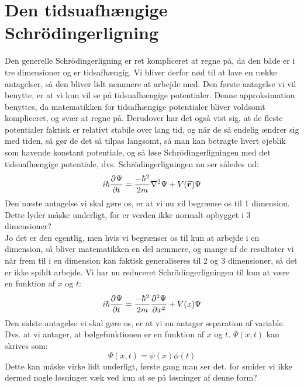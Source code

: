 \documentclass[../Kvantemekanik.tex]{subfiles}
\begin{document}
\section{Den tidsuafhængige Schrödingerligning}
Den generelle Schrödingerligning er ret kompliceret at regne på, da den både er i tre dimensioner og er tidsafhængig. Vi bliver derfor nød til at lave en række antagelser, så den bliver lidt nemmere at arbejde med.
Den første antagelse vi vil benytte, er at vi kun vil se på tidsuafhængige potentialer. Denne approksimation benyttes, da matematikken for tidsafhængige potentialer bliver voldsomt kompliceret, og svær at regne på. Derudover har det også vist sig, at de fleste potentialer faktisk er relativt stabile over lang tid, og når de så endelig ændrer sig med tiden, så gør de det så tilpas langsomt, så man kan betragte hvert øjeblik som havende konstant potentiale, og så løse Schrödingerligningen med det tidsuafhængige potentiale, dvs. Schrödingerligningen nu ser således ud:
\begin{equation}
    i\hbar\pdif{t} \Psi =\frac{-\hbar^{2}}{2m}\nabla^{2}\Psi+V(\v r)\Psi
\end{equation}
Den næste antagelse vi skal gøre os, er at vi nu vil begrænse os til 1 dimension. Dette lyder måske underligt, for er verden ikke normalt opbygget i 3 dimensioner?
\\
Jo det er den egentlig, men hvis vi begrænser os til kun at arbejde i en dimension, så bliver matematikken en del nemmere, og mange af de resultater vi når frem til i en dimension kan faktisk generaliseres til 2 og 3 dimensioner, så det er ikke spildt arbejde. Vi har nu reduceret Schrödingerligningen til kun at være en funktion af $x$ og $t$:
\begin{equation}
    i\hbar\pdif{t} \Psi=\frac{-\hbar^{2}}{2m}\pdif[2]{x} \Psi+V(x)\Psi
\end{equation}
Den sidste antagelse vi skal gøre os, er at vi nu antager separation af variable. Dvs. at vi antager, at bølgefunktionen er en funktion af $x$ og $t$. $\Psi(x,t)$ kan skrives som: 
\begin{equation}
\Psi(x,t)=\psi(x)\phi(t)
\label{kvant:eq:tsep}
\end{equation}
Dette kan måske virke lidt underligt, første gang man ser det, for smider vi ikke dermed nogle løsninger væk ved kun at se på løsninger af denne form?
\end{document}
